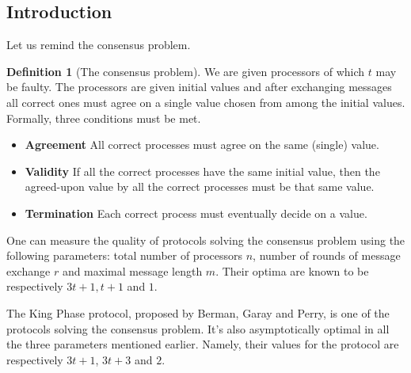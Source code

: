 \documentclass[11pt, a4paper]{report}
\begin{document}
\rhead{\today{}}

\theoremstyle{plain}
\newtheorem{thm}{Theorem} %
\newtheorem{lem}{Lemma} %
\newtheorem{exmp}{Example}%
\theoremstyle{definition}
\newtheorem{defn}{Definition} %

\subsection*{Introduction} 
Let us remind the consensus problem.
\begin{defn}[The consensus problem]
We are given processors of which $t$ may be faulty. The processors are given initial values and after exchanging messages all correct ones must agree on a single value chosen from among the initial values. Formally, three conditions must be met.
\begin{itemize}
    \item \textbf{Agreement} All correct processes must agree on the same (single) value.
    \item \textbf{Validity} If all the correct processes have the same initial value, then the agreed-upon value by all the correct processes must be that same value.
    \item \textbf{Termination} Each correct process must eventually decide on a value. 
\end{itemize}
\end{defn}

One can measure the quality of protocols solving the consensus problem using the following parameters: total number of processors $n$, number of rounds of message exchange $r$ and maximal message length $m$. Their optima are known to be respectively $3t+1, t+1$ and $1$.

The King Phase protocol, proposed by Berman, Garay and Perry, is one of the protocols solving the consensus problem. It's also asymptotically optimal in all the three parameters mentioned earlier. Namely, their values for the protocol are respectively $3t+1$, $3t+3$ and $2$.
\end{document}
